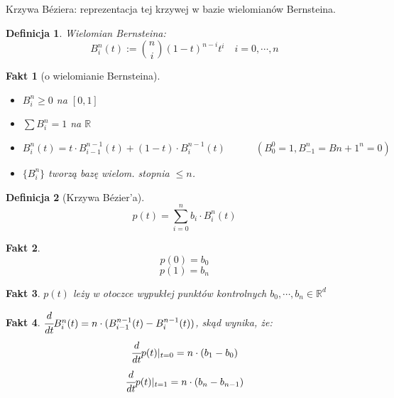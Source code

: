 \documentclass[hidelinks,a4paper,fleqn,oneside]{book}
\newcommand{\RR}{\mathbb{R}}
\newtheorem{defi}{Definicja}
\newtheorem{fakt}{Fakt}
\begin{document}
Krzywa Béziera: reprezentacja tej krzywej w bazie wielomianów Bernsteina.
\begin{defi}
	 Wielomian Bernsteina:
	 \[
	 	B_i^n(t) := \binom{n}{i} (1-t)^{n-i} t^i \quad i=0, \cdots, n
 	\]
\end{defi}

\begin{fakt}[o wielomianie Bernsteina]

	\begin{itemize}	
		\item $B_i^n \geq 0$ na $[0, 1]$
		\item $\sum B_i^n = 1$ na $\RR$
		\item $B_i^n(t) = t\cdot B_{i-1}^{n-1}(t) + (1-t) \cdot B_i^{n-1}(t) \quad \quad \quad (B_0^0 = 1, B_{-1}^n = B{n+1}^n = 0)$
		\item $\{B_i^n\}$ tworzą bazę wielom. stopnia $\leq n$.
	\end{itemize}
\end{fakt}

\begin{defi}[Krzywa Bézier'a]
	\[
		p(t) = \sum_{i=0}^n b_i \cdot B_i^n(t)
	\]
\end{defi}

\begin{fakt}
	\[
		p(0) = b_0
	\]
	\[
		p(1) = b_n
	\]
\end{fakt}

\begin{fakt}
	$p(t)$ leży w otoczce wypukłej punktów kontrolnych $b_0, \cdots, b_n \in \RR^d$
\end{fakt}

\begin{fakt}
	$\cfrac{d}{dt} B_i^n(t) = n \cdot (B_{i-1}^{n-1}(t) - B_i^{n-1}(t))$, skąd wynika, że:
	\[
		\cfrac{d}{dt} p(t)|_{t=0} = n \cdot (b_1 - b_0)
	\]
	\[
		\cfrac{d}{dt} p(t)|_{t=1} = n \cdot (b_n - b_{n-1})
	\]
\end{fakt}


\printindex
\end{document}
